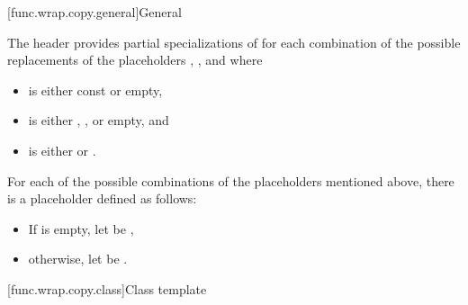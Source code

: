 [func.wrap.copy.general]{General}

\pnum
The header provides partial specializations of 
for each combination of the possible replacements
of the placeholders \cv{}, , and  where
\begin{itemize}
\item
\cv{} is either const or empty,
\item
{} is either \tcode{\&}, \tcode{\&\&}, or empty, and
\item
{} is either  or .
\end{itemize}

\pnum
For each of the possible combinations of the placeholders mentioned above,
there is a placeholder  defined as follows:
\begin{itemize}
\item
If  is empty, let  be \cv{}\tcode{\&},
\item
otherwise, let  be \cv{} .
\end{itemize}

[func.wrap.copy.class]{Class template }

